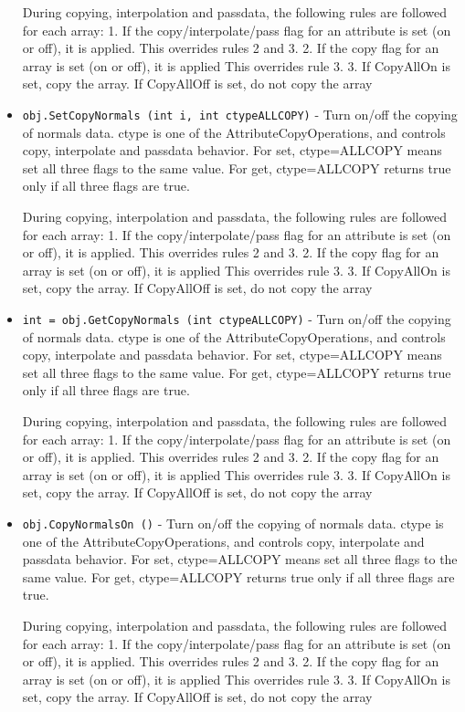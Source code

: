 \begin{itemize}
 During copying, interpolation and passdata, the following rules are 
 followed for each array:
 1. If the copy/interpolate/pass flag for an attribute is set (on or off), it is applied.
    This overrides rules 2 and 3.
 2. If the copy flag for an array is set (on or off), it is applied
    This overrides rule 3.
 3. If CopyAllOn is set, copy the array.
    If CopyAllOff is set, do not copy the array

\item  \verb|obj.SetCopyNormals (int i, int ctypeALLCOPY)| -  Turn on/off the copying of normals data.
 ctype is one of the AttributeCopyOperations, and controls copy, 
 interpolate and passdata behavior.
 For set, ctype=ALLCOPY means set all three flags to the same value.
 For get, ctype=ALLCOPY returns true only if all three flags are true.

 During copying, interpolation and passdata, the following rules are 
 followed for each array:
 1. If the copy/interpolate/pass flag for an attribute is set (on or off), it is applied.
    This overrides rules 2 and 3.
 2. If the copy flag for an array is set (on or off), it is applied
    This overrides rule 3.
 3. If CopyAllOn is set, copy the array.
    If CopyAllOff is set, do not copy the array

\item  \verb|int = obj.GetCopyNormals (int ctypeALLCOPY)| -  Turn on/off the copying of normals data.
 ctype is one of the AttributeCopyOperations, and controls copy, 
 interpolate and passdata behavior.
 For set, ctype=ALLCOPY means set all three flags to the same value.
 For get, ctype=ALLCOPY returns true only if all three flags are true.

 During copying, interpolation and passdata, the following rules are 
 followed for each array:
 1. If the copy/interpolate/pass flag for an attribute is set (on or off), it is applied.
    This overrides rules 2 and 3.
 2. If the copy flag for an array is set (on or off), it is applied
    This overrides rule 3.
 3. If CopyAllOn is set, copy the array.
    If CopyAllOff is set, do not copy the array

\item  \verb|obj.CopyNormalsOn ()| -  Turn on/off the copying of normals data.
 ctype is one of the AttributeCopyOperations, and controls copy, 
 interpolate and passdata behavior.
 For set, ctype=ALLCOPY means set all three flags to the same value.
 For get, ctype=ALLCOPY returns true only if all three flags are true.

 During copying, interpolation and passdata, the following rules are 
 followed for each array:
 1. If the copy/interpolate/pass flag for an attribute is set (on or off), it is applied.
    This overrides rules 2 and 3.
 2. If the copy flag for an array is set (on or off), it is applied
    This overrides rule 3.
 3. If CopyAllOn is set, copy the array.
    If CopyAllOff is set, do not copy the array


\end{itemize}
